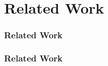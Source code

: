 \documentclass[10pt, pdf, xcolor=pdftex, dvipsnames, table]{beamer}
\begin{document}
\section[Related Work]{Related Work}

\begin{frame}
	\tableofcontents[currentsection]
\end{frame}

\begin{frame}
	\frametitle{Related Work}
\end{frame}

\begin{frame}
	\frametitle{Related Work}
\end{frame}
\end{document}
